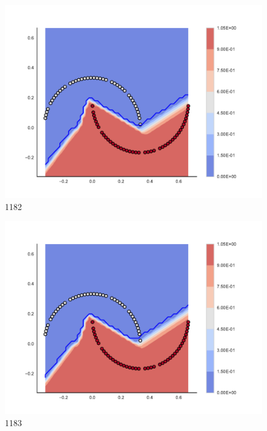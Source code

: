 \begin{subfigure}[b]{0.09\textwidth}
    \includegraphics[clip, trim=2.35cm 1.75cm 4.5cm 0cm,width=\textwidth]{img/convergence/1182.pdf}
    \caption{1182}
    \label{fig:convergence_1182}
\end{subfigure}
%
\begin{subfigure}[b]{0.09\textwidth}
    \includegraphics[clip, trim=2.35cm 1.75cm 4.5cm 0cm,width=\textwidth]{img/convergence/1183.pdf}
    \caption{1183}
    \label{fig:convergence_1183}
\end{subfigure}
%
